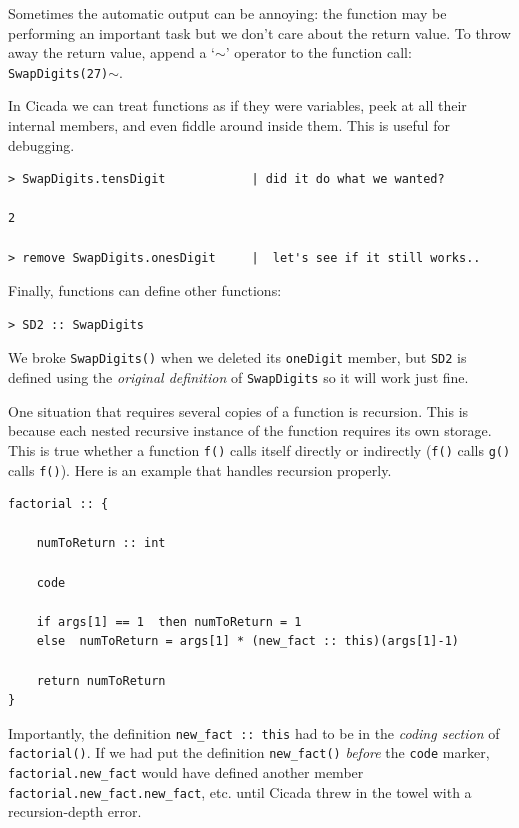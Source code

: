 \documentclass{article}
\newenvironment{code}{
       \begin{list}{}{
               \setlength{\leftmargin}{.4in}
               \setlength{\rightmargin}{0in}
               \setlength{\topsep}{.2in}
       }
       \small
       \item[] }
       { \end{list}   }
\begin{document}
\noindent Sometimes the automatic output can be annoying:  the function may be performing an important task but we don't care about the return value.  To throw away the return value, append a `$\sim$' operator to the function call:  \texttt{SwapDigits(27)}$\sim$.

In Cicada we can treat functions as if they were variables, peek at all their internal members, and even fiddle around inside them.  This is useful for debugging.

\begin{code} \begin{verbatim}
> SwapDigits.tensDigit            | did it do what we wanted?

2

> remove SwapDigits.onesDigit     |  let's see if it still works..
\end{verbatim} \end{code}

Finally, functions can define other functions:

\begin{code} \begin{verbatim}
> SD2 :: SwapDigits
\end{verbatim} \end{code}

\noindent We broke \verb#SwapDigits()# when we deleted its \verb#oneDigit# member, but \verb#SD2# is defined using the \emph{original definition} of \verb#SwapDigits# so it will work just fine.

One situation that requires several copies of a function is recursion.  This is because each nested recursive instance of the function requires its own storage.  This is true whether a function \verb#f()# calls itself directly or indirectly (\verb#f()# calls \verb#g()# calls \verb#f()#).  Here is an example that handles recursion properly.

\begin{code} \begin{verbatim}
factorial :: {
    
    numToReturn :: int
    
    code
    
    if args[1] == 1  then numToReturn = 1
    else  numToReturn = args[1] * (new_fact :: this)(args[1]-1)
    
    return numToReturn
}
\end{verbatim} \end{code}

\noindent Importantly, the definition \verb#new_fact :: this# had to be in the \emph{coding section} of \verb#factorial()#.  If we had put the definition \verb#new_fact()# \emph{before} the \verb#code# marker, \verb#factorial.new_fact# would have defined another member \verb#factorial.new_fact.new_fact#, etc. until Cicada threw in the towel with a recursion-depth error.
\end{document}
